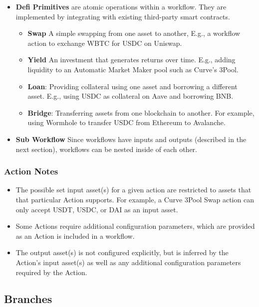 \documentclass[oneside]{article}
\begin{document}
\begin{itemize}
  \item \textbf{Defi Primitives} are atomic operations within a workflow.  They are implemented by integrating with existing third-party smart contracts.
  \begin{itemize}
    \item \textbf{Swap} A simple swapping from one asset to another, E.g., a workflow action to exchange WBTC for USDC on Uniswap. 
    \item \textbf{Yield} An investment that generates returns over time. E.g., adding liquidity to an Automatic Market Maker pool such as Curve's 3Pool.  
    \item \textbf{Loan}:  Providing collateral using one asset and borrowing a different asset.  E.g., using USDC as collateral on Aave and borrowing BNB.
    \item \textbf{Bridge}:  Transferring assets from one blockchain to another.  For example, using Wormhole to transfer USDC from Ethereum to Avalanche.
  \end{itemize}
  \item \textbf{Sub Workflow} Since workflows have inputs and outputs (described in the next section), workflows can be nested inside of each other.
\end{itemize}

\subsubsection*{Action Notes}
\begin{itemize}
  \item The possible set input asset(s) for a given action are restricted to assets that that particular Action supports.  For example, a Curve 3Pool Swap action 
  can only accept USDT, USDC, or DAI as an input asset. 
  \item Some Actions require additional configuration parameters, which are provided as an Action is included in a workflow.
  \item The output asset(s) is not configured explicitly, but is inferred by the Action's input asset(s) as well as any additional configuration parameters required by the Action.
\end{itemize}

\subsection*{Branches}
\end{document}
